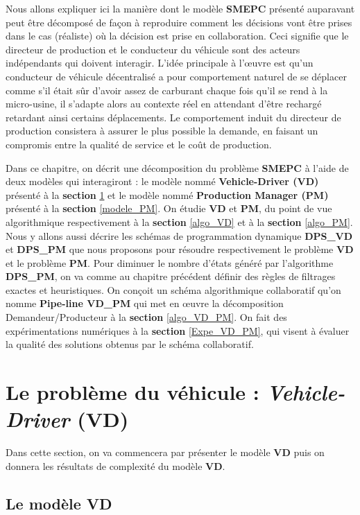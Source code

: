 Nous allons expliquer ici la manière dont le modèle \textbf{SMEPC} présenté auparavant peut être décomposé de façon à reproduire comment les décisions vont être prises dans le cas (réaliste) où la décision est prise en collaboration. Ceci signifie que le directeur de production et le conducteur du véhicule sont des acteurs indépendants qui doivent interagir. L'idée principale à l'œuvre est qu'un conducteur de véhicule décentralisé a pour comportement naturel de se déplacer comme s'il était sûr d'avoir assez de carburant chaque fois qu'il se rend à la micro-usine, il s'adapte alors au contexte réel en attendant d'être rechargé retardant ainsi certains déplacements. Le comportement induit du directeur de production consistera à assurer le plus possible la demande, en faisant un compromis entre la qualité de service et le coût de production. 

Dans ce chapitre, on décrit une décomposition du problème \textbf{SMEPC} à l'aide de deux modèles qui interagiront : le modèle nommé \textbf{Vehicle-Driver (VD)}  présenté à la \textbf{section} \ref{modele_VD} et le modèle nommé \textbf{Production Manager (PM)} présenté à la \textbf{section} \ref{modele_PM}. On étudie \textbf{VD} et \textbf{PM}, du point de vue algorithmique respectivement à la \textbf{section} \ref{algo_VD} et à la \textbf{section} \ref{algo_PM}. Nous y allons aussi décrire les schémas de programmation dynamique \textbf{DPS\_VD} et \textbf{DPS\_PM} que nous proposons pour résoudre respectivement le problème \textbf{VD} et le problème \textbf{PM}. Pour diminuer le nombre d'états généré par l'algorithme \textbf{DPS\_PM}, on va comme au chapitre précédent définir des règles de filtrages exactes et heuristiques. On conçoit un schéma algorithmique collaboratif qu'on nomme \textbf{Pipe-line VD\_PM} qui met en œuvre la décomposition Demandeur/Producteur à la \textbf{section} \ref{algo_VD_PM}. On fait des expérimentations numériques à la \textbf{section} \ref{Expe_VD_PM}, qui visent à évaluer la qualité des solutions obtenus par le schéma collaboratif. 
\section{Le problème du véhicule : \textit{Vehicle-Driver} (VD)}
\label{modele_VD}
Dans cette section, on va commencera par présenter le modèle \textbf{VD} puis on donnera les résultats de complexité du modèle \textbf{VD}. 
\subsection{Le modèle VD}

